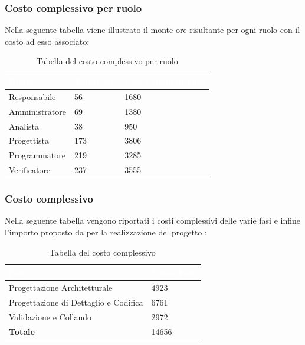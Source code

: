 \subsubsection{Costo complessivo per ruolo}
Nella seguente tabella viene illustrato il monte ore risultante per ogni ruolo con il costo ad esso associato:
{
	\renewcommand{\arraystretch}{2}

	\begin{longtable}{ C{3cm} C{2cm} C{4cm}}
	\caption{Tabella del costo complessivo per ruolo}\\
		\textcolor{white}{\textbf{Ruolo}} & 
		\textcolor{white}{\textbf{Totale ore}} & 
		\textcolor{white}{\textbf{Costo ruolo in euro}}\\	
	\endhead
        
        Responsabile & 56 &  1680\\
        Amministratore & 69 & 1380 \\
        Analista & 38 & 950 \\
        Progettista & 173 & 3806 \\
        Programmatore & 219 & 3285 \\
        Verificatore & 237 & 3555 \\
        	
	\end{longtable}

}

\subsubsection{Costo complessivo}
Nella seguente tabella vengono riportati i costi complessivi delle varie fasi e infine l'importo proposto da \Gruppo{} per la realizzazione del progetto \NomeProgetto{}:\\
{
	\renewcommand{\arraystretch}{2}

	
	\begin{longtable}{ C{5cm} C{5cm}}
	\caption{Tabella del costo complessivo}\\
		\textcolor{white}{\textbf{Fase}} &
		\textcolor{white}{\textbf{Costo Fase}}\\	
		\endhead
		
		Progettazione Architetturale & 4923 \\
		Progettazione di Dettaglio e Codifica & 6761 \\
		Validazione e Collaudo & 2972 \\
		\textbf{Totale} & 14656\\
		
	\end{longtable}

}



